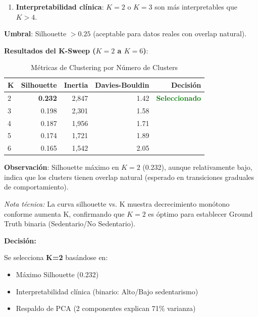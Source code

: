 \documentclass[12pt,letterpaper,twoside]{report}
\begin{document}
\begin{calculobox}
\begin{reglabox}
\begin{enumerate}[noitemsep]
    \item \textbf{Interpretabilidad clínica}: $K=2$ o $K=3$ son más interpretables que $K>4$.
\end{enumerate}

\textbf{Umbral}: Silhouette $> 0.25$ (aceptable para datos reales con overlap natural).
\end{reglabox}

\begin{calculobox}
\textbf{Resultados del K-Sweep ($K=2$ a $K=6$)}:

\begin{table}[H]
\centering
\caption{Métricas de Clustering por Número de Clusters}
\label{tab:k_sweep}
\begin{tabular}{@{}lrrrr@{}}
\toprule
\textbf{K} & \textbf{Silhouette} & \textbf{Inertia} & \textbf{Davies-Bouldin} & \textbf{Decisión} \\
\midrule
2 & \textbf{0.232} & 2,847 & 1.42 & \textcolor{green}{\textbf{Seleccionado}} \\
3 & 0.198       & 2,301 & 1.58 & \\
4 & 0.187       & 1,956 & 1.71 & \\
5 & 0.174       & 1,721 & 1.89 & \\
6 & 0.165       & 1,542 & 2.05 & \\
\bottomrule
\end{tabular}
\end{table}

\textbf{Observación}: Silhouette máximo en $K=2$ (0.232), aunque relativamente bajo, indica que los clusters tienen overlap natural (esperado en transiciones graduales de comportamiento).

\textit{Nota técnica:} La curva silhouette vs. K muestra decrecimiento monótono conforme aumenta K, confirmando que $K=2$ es óptimo para establecer Ground Truth binaria (Sedentario/No Sedentario).
\end{calculobox}

\begin{decisionbox}
\textbf{Decisión:}

Se selecciona \textbf{K=2} basándose en:
\begin{itemize}[noitemsep]
    \item Máximo Silhouette (0.232)
    \item Interpretabilidad clínica (binario: Alto/Bajo sedentarismo)
    \item Respaldo de PCA (2 componentes explican 71\% varianza)
\end{itemize}


\end{decisionbox}
\end{calculobox}
\end{document}
